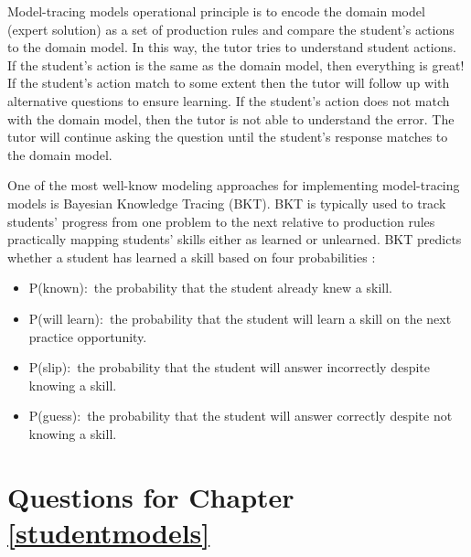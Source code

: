 \documentclass[
]{book}
\providecommand{\tightlist}{%
  \setlength{\itemsep}{0pt}\setlength{\parskip}{0pt}}
\begin{document}
Model-tracing models operational principle is to encode the domain model (expert solution) as a set of production rules and compare the student's actions to the domain model. In this way, the tutor tries to understand student actions. If the student's action is the same as the domain model, then everything is great! If the student's action match to some extent then the tutor will follow up with alternative questions to ensure learning. If the student's action does not match with the domain model, then the tutor is not able to understand the error. The tutor will continue asking the question until the student's response matches to the domain model.

One of the most well-know modeling approaches for implementing model-tracing models is Bayesian Knowledge Tracing (BKT). BKT is typically used to track students' progress from one problem to the next relative to production rules practically mapping students' skills either as learned or unlearned. BKT predicts whether a student has learned a skill based on four probabilities \citep{corbett1994knowledge}:

\begin{itemize}
\tightlist
\item
  P(known):~the probability that the student already knew a skill.
\item
  P(will learn):~the probability that the student will learn a skill on the next practice opportunity.
\item
  P(slip):~the probability that the student will answer incorrectly despite knowing a skill.
\item
  P(guess):~the probability that the student will answer correctly despite not knowing a skill.
\end{itemize}

\section{Questions for Chapter \ref{studentmodels}}\label{questions-for-chapter-refstudentmodels}
\end{document}
